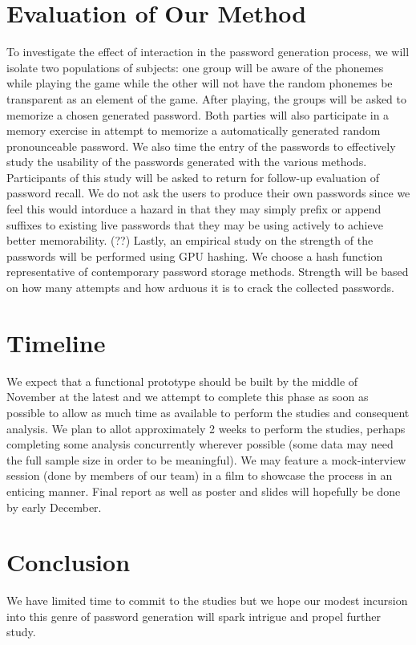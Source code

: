 \documentclass[conference]{IEEEtran}
\begin{document}
\section{Evaluation of Our Method}
To investigate the effect of interaction in the password generation process, we will isolate two populations of subjects: one group will be aware of the phonemes while playing the game while the other will not have the random phonemes be transparent as an element of the game. After playing, the groups will be asked to memorize a chosen generated password. Both parties will also participate in a memory exercise in attempt to memorize a automatically generated random pronounceable password. We also time the entry of the passwords to effectively study the usability of the passwords generated with the various methods. Participants of this study will be asked to return for follow-up evaluation of password recall. We do not ask the users to produce their own passwords since we feel this would intorduce a hazard in that they may simply prefix or append suffixes to existing live passwords that they may be using actively to achieve better memorability. (??) Lastly, an empirical study on the strength of the passwords will be performed using GPU hashing. We choose a hash function representative of contemporary password storage methods. Strength will be based on how many attempts and how arduous it is to crack the collected passwords.

\section{Timeline}
We expect that a functional prototype should be built by the middle of November at the latest and we attempt to complete this phase as soon as possible to allow as much time as available to perform the studies and consequent analysis. We plan to allot approximately 2 weeks to perform the studies, perhaps completing some analysis concurrently wherever possible (some data may need the full sample size in order to be meaningful). We may feature a mock-interview session (done by members of our team) in a film to showcase the process in an enticing manner. Final report as well as poster and slides will hopefully be done by early December. 

\section{Conclusion}
We have limited time to commit to the studies but we hope our modest incursion into this genre of password generation will spark intrigue and propel further study.





\end{document}
